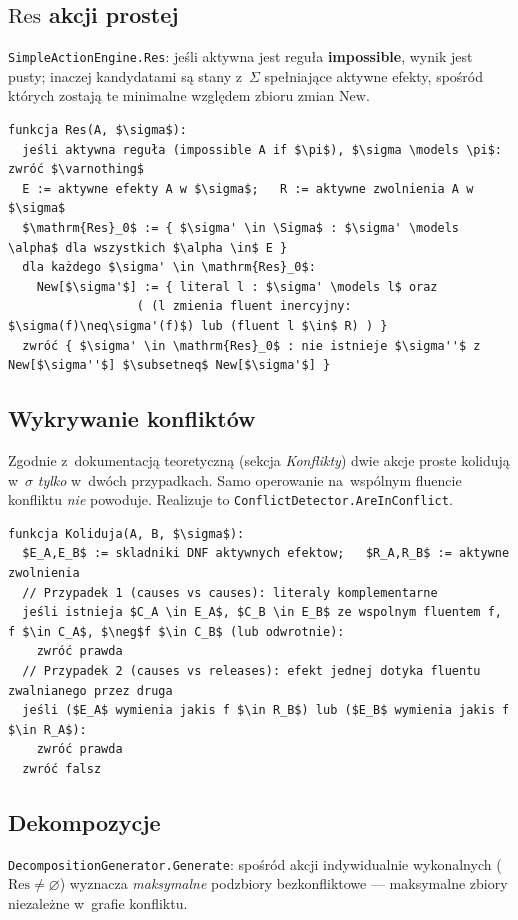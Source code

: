 \documentclass[11pt,a4paper]{article}
\newcommand{\Res}{\mathrm{Res}}
\newcommand{\New}{\mathrm{New}}
\begin{document}
\subsection{$\Res$ akcji prostej}
\texttt{SimpleActionEngine.Res}: jeśli aktywna jest reguła \textbf{impossible},
wynik jest pusty; inaczej kandydatami są stany z~$\Sigma$ spełniające aktywne
efekty, spośród których zostają te minimalne względem zbioru zmian $\New$.

\begin{lstlisting}[style=ds4pseudo]
funkcja Res(A, $\sigma$):
  jeśli aktywna reguła (impossible A if $\pi$), $\sigma \models \pi$: zwróć $\varnothing$
  E := aktywne efekty A w $\sigma$;   R := aktywne zwolnienia A w $\sigma$
  $\mathrm{Res}_0$ := { $\sigma' \in \Sigma$ : $\sigma' \models \alpha$ dla wszystkich $\alpha \in$ E }
  dla każdego $\sigma' \in \mathrm{Res}_0$:
    New[$\sigma'$] := { literal l : $\sigma' \models l$ oraz
                  ( (l zmienia fluent inercyjny: $\sigma(f)\neq\sigma'(f)$) lub (fluent l $\in$ R) ) }
  zwróć { $\sigma' \in \mathrm{Res}_0$ : nie istnieje $\sigma''$ z New[$\sigma''$] $\subsetneq$ New[$\sigma'$] }
\end{lstlisting}

\subsection{Wykrywanie konfliktów}
Zgodnie z~dokumentacją teoretyczną (sekcja \emph{Konflikty}) dwie akcje proste
kolidują w~$\sigma$ \emph{tylko} w~dwóch przypadkach. Samo operowanie na~wspólnym
fluencie konfliktu \emph{nie} powoduje. Realizuje to
\texttt{ConflictDetector.AreInConflict}.

\begin{lstlisting}[style=ds4pseudo]
funkcja Koliduja(A, B, $\sigma$):
  $E_A,E_B$ := skladniki DNF aktywnych efektow;   $R_A,R_B$ := aktywne zwolnienia
  // Przypadek 1 (causes vs causes): literaly komplementarne
  jeśli istnieja $C_A \in E_A$, $C_B \in E_B$ ze wspolnym fluentem f, f $\in C_A$, $\neg$f $\in C_B$ (lub odwrotnie):
    zwróć prawda
  // Przypadek 2 (causes vs releases): efekt jednej dotyka fluentu zwalnianego przez druga
  jeśli ($E_A$ wymienia jakis f $\in R_B$) lub ($E_B$ wymienia jakis f $\in R_A$):
    zwróć prawda
  zwróć falsz
\end{lstlisting}

\subsection{Dekompozycje}
\texttt{DecompositionGenerator.Generate}: spośród akcji indywidualnie
wykonalnych ($\Res \neq \varnothing$) wyznacza \emph{maksymalne} podzbiory
bezkonfliktowe --- maksymalne zbiory niezależne w~grafie konfliktu.
\end{document}
